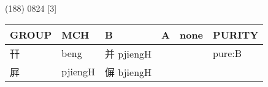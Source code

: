 \documentclass[14pt,a4paper]{scrartcl}
\begin{document}
(188) 0824 {[}3{]}

\begin{longtable}[c]{@{}llllll@{}}
\toprule
\begin{minipage}[b]{0.14\columnwidth}\raggedright\strut
GROUP
\strut\end{minipage} &
\begin{minipage}[b]{0.14\columnwidth}\raggedright\strut
MCH
\strut\end{minipage} &
\begin{minipage}[b]{0.14\columnwidth}\raggedright\strut
B
\strut\end{minipage} &
\begin{minipage}[b]{0.14\columnwidth}\raggedright\strut
A
\strut\end{minipage} &
\begin{minipage}[b]{0.14\columnwidth}\raggedright\strut
none
\strut\end{minipage} &
\begin{minipage}[b]{0.14\columnwidth}\raggedright\strut
PURITY
\strut\end{minipage}\tabularnewline
\midrule
\endhead
\begin{minipage}[t]{0.14\columnwidth}\raggedright\strut
幵
\strut\end{minipage} &
\begin{minipage}[t]{0.14\columnwidth}\raggedright\strut
beng
\strut\end{minipage} &
\begin{minipage}[t]{0.14\columnwidth}\raggedright\strut
并 pjiengH
\strut\end{minipage} &
\begin{minipage}[t]{0.14\columnwidth}\raggedright\strut
\strut\end{minipage} &
\begin{minipage}[t]{0.14\columnwidth}\raggedright\strut
\strut\end{minipage} &
\begin{minipage}[t]{0.14\columnwidth}\raggedright\strut
pure:B
\strut\end{minipage}\tabularnewline
\begin{minipage}[t]{0.14\columnwidth}\raggedright\strut
屛
\strut\end{minipage} &
\begin{minipage}[t]{0.14\columnwidth}\raggedright\strut
pjiengH
\strut\end{minipage} &
\begin{minipage}[t]{0.14\columnwidth}\raggedright\strut
偋 bjiengH
\strut\end{minipage} &

\end{longtable}
\end{document}
